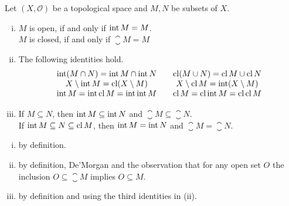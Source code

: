 \begin{lemma}
	Let $(X,\mathcal{O})$ be a topological space and $M,N$ be subsets of $X$.
	\begin{enumerate}[(i)]
		\item{
			$M$ is open, if and only if $\operatorname{int} M = M$.\\
			$M$ is closed, if and only if $\closure M = M$
		}
		\item{
			The following identities hold.
			\begin{equation*}
				\begin{array}{ccc}
					\operatorname{int} (M \cap N) = \operatorname{int} M \cap \operatorname{int} N&&
					\operatorname{cl}(M \cup N) = \operatorname{cl} M \cup \operatorname{cl} N\\
					X \setminus \operatorname{int} M = \operatorname{cl} (X \setminus M)&&
					X \setminus \operatorname{cl} M = \operatorname{int} (X \setminus M)\\
					\operatorname{int} M = \operatorname{int} \operatorname{cl} M = \operatorname{int} \operatorname{int} M&&
					\operatorname{cl} M = \operatorname{cl} \operatorname{int} M = \operatorname{cl} \operatorname{cl} M
				\end{array}
			\end{equation*}
		}
		\item{
			If $M \subseteq N$, then $\operatorname{int} M \subseteq \operatorname{int} N$ and $\closure M \subseteq \closure N$.\\
			If $\operatorname{int} M \subseteq N \subseteq \operatorname{cl} M$, then $\operatorname{int} M = \operatorname{int} N$ and $\closure M = \closure N$.
		}
	\end{enumerate}
\end{lemma}
\begin{sketch}
	\begin{enumerate}[(i)]
		\item{
			by definition.
		}
		\item{
			by definition, De'Morgan and the observation that for any open set $O$ the inclusion $O \subseteq \closure M$ implies $O \subseteq M$.
		}
		\item{
			by definition and using the third identities in (ii).
		}
		\vspace{-2em}
	\end{enumerate}
\end{sketch}

